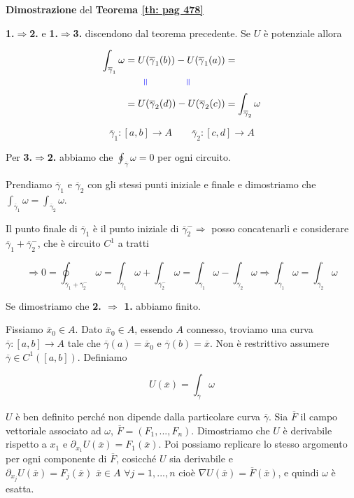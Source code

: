 \begin{dembar}
	\textbf{Dimostrazione} del \textbf{Teorema \ref{th: pag 478}}
	
	\textbf{1.$\Rightarrow $2.} e \textbf{1.$\Rightarrow $3.} discendono dal teorema precedente. Se $U$ è potenziale allora
	
	\begin{align*} 
		\int_{\overline{\gamma}_1}\omega
		&=U(\overline{\gamma}_1(b))-U(\overline{\gamma}_1(a))=
		\\
		& {\color{blue} \qquad \rotatebox{90}{=} \qquad\qquad \rotatebox{90}{=}}
		\\
		&= U(\overline{\gamma}_2(d))-U(\overline{\gamma}_2(c))= \int_{\overline{\gamma}_2}\omega
	\end{align*}
	
	{\color{blue} $$\overline{\gamma}_1 : [a,b]\to A \qquad \overline{\gamma}_2:[c,d]\to A$$}
	
	Per \textbf{3.$\Rightarrow$2.} abbiamo che $\oint_{\overline{\gamma}}\omega =0$ per ogni circuito.
	
	Prendiamo $\overline{\gamma}_1$ e $\overline{\gamma}_2$ con gli stessi punti iniziale e finale e dimostriamo che $\int_{\overline{\gamma}_1}\omega=\int_{\overline{\gamma}_2}\omega$.

	\segnaposto %

	Il punto finale di $\overline{\gamma}_1$ è il punto iniziale di $\overline{\gamma}_2^- \Rightarrow$ posso concatenarli e considerare $\overline{\gamma}_1+\overline{\gamma}_2^-$, che è circuito $C^1$ a tratti
	
	$$\Rightarrow 0 =\oint_{\overline{\gamma}_1+\overline{\gamma}_2^-}\omega=\int_{\overline{\gamma}_1}\omega+\int_{\overline{\gamma}_2^-}\omega= \int_{\overline{\gamma}_1}\omega - \int_{\overline{\gamma}_2}\omega\Rightarrow \int_{\overline{\gamma}_1}\omega = \int_{\overline{\gamma}_2}\omega$$
	
	Se dimostriamo che \textbf{2. $\Rightarrow$ 1.} abbiamo finito.
	
	Fissiamo $\overline{x}_0\in A$. Dato $\overline{x}_0 \in A$,  essendo $A$ connesso, troviamo una curva $\overline{\gamma}:[a,b]\rightarrow A$ tale che $\overline{\gamma}(a)=\overline{x}_0$ e $\overline{\gamma}(b)=\overline{x}$. Non è restrittivo assumere $\overline{\gamma}\in C^1([a,b])$. Definiamo
	
	$$U(\overline{x})=\int_{\overline{\gamma}}\omega$$
	
	$U $ è ben definito perché non dipende dalla particolare curva $\overline{\gamma}$. Sia $\overline{F}$ il campo vettoriale associato ad $\omega$, $\overline{F}=(F_1,...,F_n)$. Dimostriamo che $U$ è derivabile rispetto a $x_1$ e $\partial_{x_1}U(\overline{x})=F_1(\overline{x})$. Poi possiamo replicare lo stesso argomento per ogni componente di $\overline{F}$, cosicché $U$ sia derivabile e $\partial_{x_j}U(\overline{x})=F_j(\overline{x})\,\, \overline{x}\in A\,\, \forall j=1,...,n$ cioè $\nabla U(\overline{x})=\overline{F}(\overline{x})$, e quindi $\omega$ è esatta.


\end{dembar}
